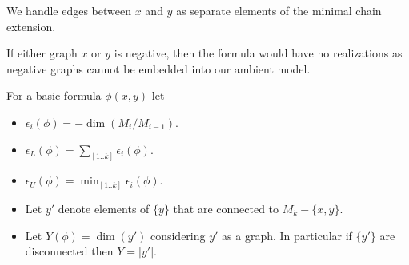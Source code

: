 \documentclass{amsart}
\newcommand{\paren}[1]{\left(#1\right)}
\begin{document}



\begin{Note} \label{note_edges}
	We handle edges between $x$ and $y$ as separate elements of the minimal chain extension.
\end{Note}

\begin{Note} \label{note_positive}
	If either graph $x$ or $y$ is negative, then the formula would have no realizations as negative graphs cannot be embedded into our ambient model.
\end{Note}


\begin{Definition} \label{def_basic}
	For a basic formula $\phi(x, y)$ let
	\begin{itemize}
		\item $\epsilon_i(\phi) = -\dim \paren{M_i/M_{i-1}}$.
		\item $\epsilon_L(\phi) = \sum_{[1..k]} \epsilon_i(\phi)$.
		\item $\epsilon_U(\phi) = \min_{[1..k]} \epsilon_i(\phi)$.
		\item Let $y'$ denote elements of $\{y\}$ that are connected to $M_k - \{x,y\}$.
		\item Let $Y(\phi) = \dim (y')$ considering $y'$ as a graph.
		In particular if $\{y'\}$ are disconnected then $Y = |y'|$.
	\end{itemize}
\end{Definition}

\end{document}
